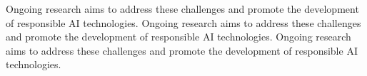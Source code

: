 \begin{englishabstract}
  
  Ongoing research aims to address these challenges and promote the development of responsible AI technologies. Ongoing research aims to address these challenges and promote the development of responsible AI technologies. 
  Ongoing research aims to address these challenges and promote the development of responsible AI technologies. 
  
\noindent	
{}
\end{englishabstract}